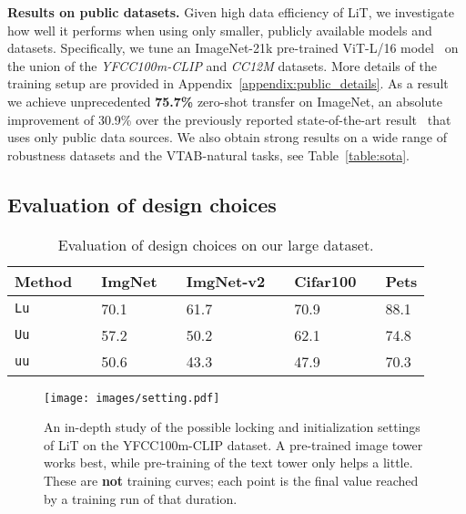 \documentclass[10pt,twocolumn,letterpaper]{article}
\def \lit {LiT\xspace}
\def \Lu {{\tt Lu}\xspace}
\def \Uu {{\tt Uu}\xspace}
\def \uu {{\tt uu}\xspace}
\begin{document}
\textbf{Results on public datasets.}
Given high data efficiency of \lit, we investigate how well it performs when using only smaller, publicly available models and datasets.
Specifically, we tune an ImageNet-21k pre-trained ViT-L/16 model~\cite{augreg} on the union of the
\emph{YFCC100m-CLIP} and \emph{CC12M} datasets. More details of the training setup are provided in Appendix~\ref{appendix:public_details}.
As a result we achieve unprecedented \textbf{75.7\%} zero-shot transfer on ImageNet, an absolute improvement of 30.9\% over the previously reported state-of-the-art result~\cite{openclip} that uses only public data sources. We also obtain strong results on a wide range of robustness datasets and the VTAB-natural tasks, see Table~\ref{table:sota}. 



\subsection{Evaluation of design choices}
\label{sec:design_choices}

\begin{table}[t]
  \setlength{\tabcolsep}{0pt}
  \setlength{\extrarowheight}{5pt}
  \renewcommand{\arraystretch}{0.75}
  \centering
\begin{tabularx}{\linewidth}{p{1.5cm}p{0.1cm}Cp{0.1cm}Cp{0.1cm}Cp{0.1cm}C}
    \toprule[1pt]
     \bf{Method} && \bf{ImgNet} && \bf{ImgNet-v2} && \bf{Cifar100} && \bf{Pets}\\
    \midrule
     \Lu && 70.1 && 61.7 && 70.9 && 88.1 \\
     \Uu && 57.2 && 50.2 && 62.1 && 74.8 \\
     \uu && 50.6 && 43.3 && 47.9 && 70.3 \\
    \bottomrule[1pt]
  \end{tabularx}
  \caption{Evaluation of design choices on our large dataset.}\label{table:design_our}
\end{table}

\begin{figure}[t]
    \centering
    \texttt{[image: images/setting.pdf]}
    \caption{An in-depth study of the possible locking and initialization settings of \protect\lit on the YFCC100m-CLIP dataset. A pre-trained image tower works best, while pre-training of the text tower only helps a little. These are \textbf{not} training curves; each point is the final value reached by a training run of that duration.}
    \label{fig:design}
\end{figure}
\end{document}

